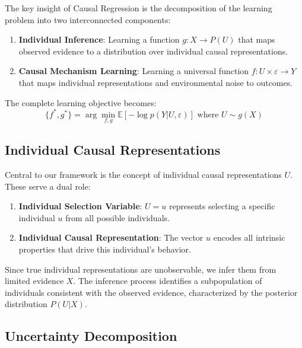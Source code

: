 \documentclass[conference]{IEEEtran}
\newcommand{\expectation}{\mathbb{E}}
\begin{document}
The key insight of Causal Regression is the decomposition of the learning problem into two interconnected components:

\begin{enumerate}
\item \textbf{Individual Inference}: Learning a function $g: X \rightarrow P(U)$ that maps observed evidence to a distribution over individual causal representations.

\item \textbf{Causal Mechanism Learning}: Learning a universal function $f: U \times \varepsilon \rightarrow Y$ that maps individual representations and environmental noise to outcomes.
\end{enumerate}

The complete learning objective becomes:
\begin{equation}
\{f^*, g^*\} = \arg\min_{f,g} \expectation[-\log p(Y|U,\varepsilon)] \text{ where } U \sim g(X)
\end{equation}

\subsection{Individual Causal Representations}

Central to our framework is the concept of individual causal representations $U$. These serve a dual role:

\begin{enumerate}
\item \textbf{Individual Selection Variable}: $U = u$ represents selecting a specific individual $u$ from all possible individuals.

\item \textbf{Individual Causal Representation}: The vector $u$ encodes all intrinsic properties that drive this individual's behavior.
\end{enumerate}

Since true individual representations are unobservable, we infer them from limited evidence $X$. The inference process identifies a subpopulation of individuals consistent with the observed evidence, characterized by the posterior distribution $P(U|X)$.

\subsection{Uncertainty Decomposition}
\end{document}
